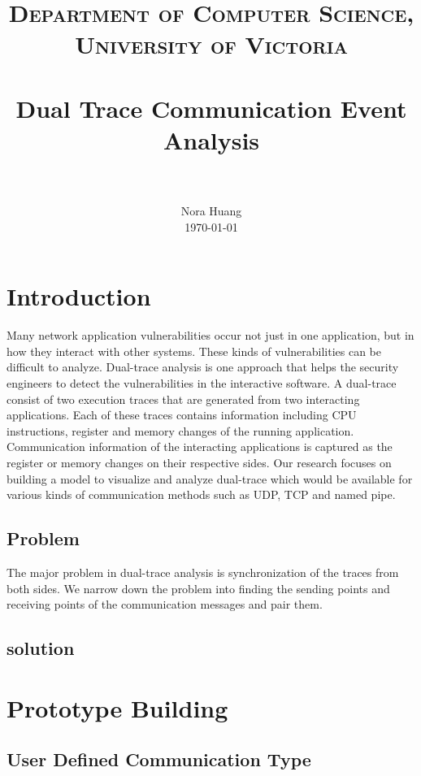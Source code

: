 \documentclass[paper=a4, fontsize=11pt]{scrartcl}
\title{
		\usefont{OT1}{bch}{b}{n}
		\normalfont \normalsize \textsc{Department of Computer Science,  University of Victoria} \\ [25pt]
		\horrule{0.5pt} \\[0.4cm]
		\huge Dual Trace Communication Event Analysis  \\
		\horrule{2pt} \\[0.5cm]
}
\author{
		\normalfont 								\normalsize
        Nora Huang\\[-3pt]		\normalsize
        \today
}
\date{}
\numberwithin{equation}{section}		%
\numberwithin{figure}{section}			%
\numberwithin{table}{section}				%
\begin{document}
\maketitle

\section{Introduction}
Many network application vulnerabilities occur not just in one application, but in how they interact with other systems. These kinds of vulnerabilities can be difficult to analyze. Dual-trace analysis is one approach that helps the security engineers to detect the vulnerabilities in the interactive software. A dual-trace consist of two execution traces that are generated from two interacting applications. Each of these traces contains information including CPU instructions, register and memory changes of the running application. Communication information of the interacting applications is captured as the register or memory changes on their respective sides. Our research focuses on building a model to visualize and analyze dual-trace which would be available for various kinds of communication methods such as UDP, TCP and named pipe. 

\subsection{Problem}
The major problem in dual-trace analysis is synchronization of the traces from both sides. We narrow down the problem into finding the sending points and receiving points of the communication messages and pair them. 

\subsection{solution}

\section{Prototype Building}
\subsection{User Defined Communication Type}
\end{document}
